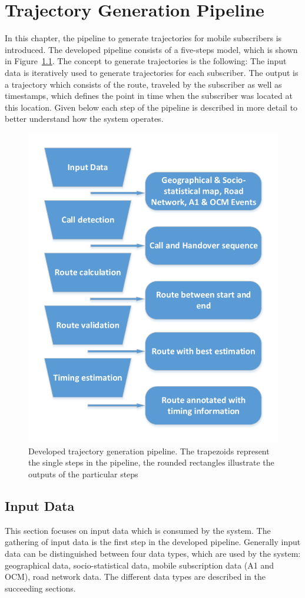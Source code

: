 \chapter{Trajectory Generation Pipeline}
In this chapter, the pipeline to generate trajectories for mobile subscribers is introduced. The developed pipeline consists of a five-steps model, which is shown in Figure~\ref{fig:pipeline}. The concept to generate trajectories is the following: The input data is iteratively used to generate trajectories for each subscriber. The output is a trajectory which consists of the route, traveled by the subscriber as well as timestamps, which defines the point in time when the subscriber was located at this location. Given below each step of the pipeline is described in more detail to better understand how the system operates. 
\begin{figure}
	\centering
	\includegraphics[width=0.7\linewidth]{./images/pipeline}
	\caption{Developed trajectory generation pipeline. The trapezoids represent the single steps in the pipeline, the rounded rectangles illustrate the
	outputs of the particular steps}
	\label{fig:pipeline}
\end{figure}
\section{Input Data}
This section focuses on input data which is consumed by the system. The gathering of input data is the first step in the developed pipeline. Generally input data can be distinguished between four data types, which are used by the system: geographical data, socio-statistical data, mobile subscription data (A1 and OCM), road network data. The different data types are described in the succeeding sections.
